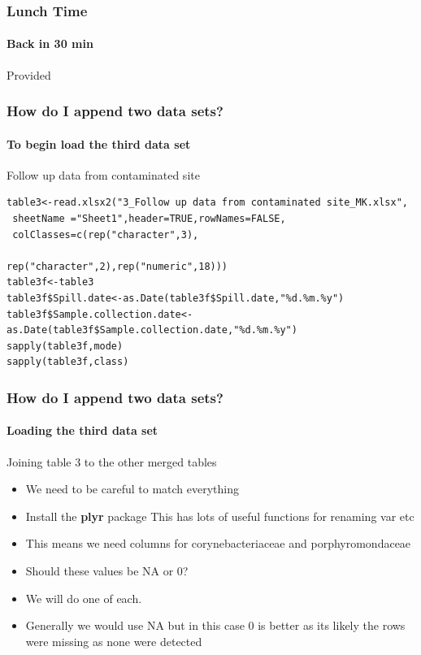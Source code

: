 \documentclass[12pt]{beamer}\usepackage[]{graphicx}\usepackage[]{color}
\begin{document}
\begin{frame}
  \frametitle{Lunch Time}
  \framesubtitle{Back in 30 min}
  Provided
\end{frame}

\begin{frame}[fragile]
  \frametitle{How do I append two data sets?}
  \framesubtitle{To begin load the third data set}
  \begin{block}{Follow up data from contaminated site}

  \end{block}
\begin{lstlisting} 
table3<-read.xlsx2("3_Follow up data from contaminated site_MK.xlsx",
 sheetName ="Sheet1",header=TRUE,rowNames=FALSE,
 colClasses=c(rep("character",3),

rep("character",2),rep("numeric",18)))
table3f<-table3
table3f$Spill.date<-as.Date(table3f$Spill.date,"%d.%m.%y")
table3f$Sample.collection.date<-as.Date(table3f$Sample.collection.date,"%d.%m.%y")
sapply(table3f,mode)
sapply(table3f,class)
\end{lstlisting}
  

\end{frame}

\begin{frame}[fragile]
  \frametitle{How do I append two data sets?}
  \framesubtitle{Loading the third data set}
  \begin{block}{Joining table 3 to the other merged tables}
  \begin{itemize}
  \item We need to be careful to match everything
  \item Install the {\bf plyr} package This has lots of useful functions for renaming var etc
  \item This means we need columns for corynebacteriaceae and porphyromondaceae
  \item Should these values be NA or 0?
  \item We will do one of each. 
  \item Generally we would use NA but in this case 0 is better as its likely the rows were missing as none were detected
 \end{itemize}
  \end{block}
\end{frame}
\end{document}
